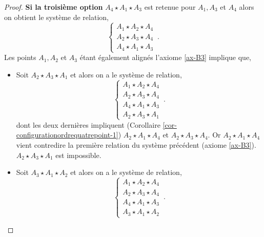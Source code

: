 \begin{cor}
\begin{proof}
        \textbf{Si la troisième option} $A_4 \star A_1 \star A_3$ est retenue pour $A_1,A_3$ et $A_4$ alors on obtient le système de relation,
        \begin{equation*}
        \left\{
            \begin{array}{c}
                 A_1 \star A_2 \star A_4 \\
                 A_2 \star A_3 \star A_4 \\
                 A_4 \star A_1 \star A_3 
            \end{array}
            \right. \,.
        \end{equation*}
        Les points $A_1,A_2$ et $A_3$ étant également alignés l'axiome \ref{ax-B3} implique que, 
        \begin{itemize}[$\bullet$]
            \item Soit $A_2 \star A_3 \star A_1$ et alors on a le système de relation,
            \begin{equation*}
            \left\{
            \begin{array}{c}
                 A_1 \star A_2 \star A_4 \\
                 A_2 \star A_3 \star A_4 \\
                 A_4 \star A_1 \star A_3 \\
                 A_2 \star A_3 \star A_1
            \end{array}
            \right. \,.
            \end{equation*}
            dont les deux dernières impliquent (Corollaire \ref{cor-configurationordrequatrepoint-1}) $A_2 \star A_1 \star A_4$ et $A_2 \star A_3 \star A_4$. Or $A_2 \star A_1 \star A_4$ vient contredire la première relation du système précédent (axiome \ref{ax-B3}). $A_2 \star A_3 \star A_1$ est impossible.
            \item Soit $A_3 \star A_1 \star A_2$ et alors on a le système de relation,
            \begin{equation*}
            \left\{
            \begin{array}{c}
                 A_1 \star A_2 \star A_4 \\
                 A_2 \star A_3 \star A_4 \\
                 A_4 \star A_1 \star A_3 \\
                 A_3 \star A_1 \star A_2
            \end{array}
            \right. \,.
            \end{equation*}

\end{itemize}
\end{proof}
\end{cor}

